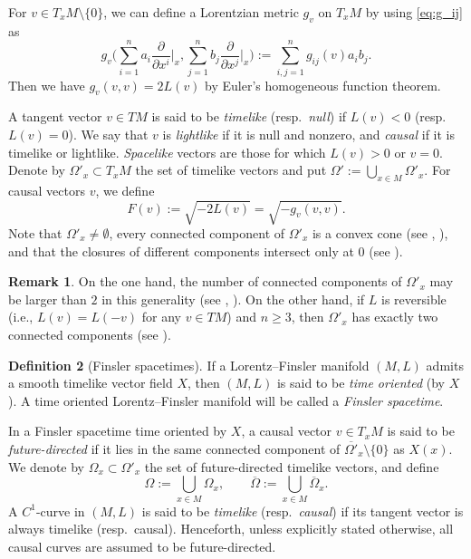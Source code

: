 \documentclass[a4paper,11pt]{article}
\numberwithin{equation}{section}
\theoremstyle{definition}
\newtheorem{definition}{Definition}[section]
\newtheorem{remark}[definition]{Remark}
\theoremstyle{plain}
\newcommand{\del}{\partial}
\begin{document}
For $v \in T_xM \setminus \{0\}$, we can define a Lorentzian metric $g_v$ on $T_xM$
by using \eqref{eq:g_ij} as
\begin{equation}\label{eq:g_v}
g_v \Bigg( \sum_{i=1}^n a_i \frac{\del}{\del x^i}\bigg|_x,
 \sum_{j=1}^n b_j \frac{\del}{\del x^j}\bigg|_x \Bigg)
 :=\sum_{i,j=1}^n g_{ij}(v) a_i b_j.
\end{equation}
Then we have $g_v(v,v)=2L(v)$ by Euler's homogeneous function theorem.

A tangent vector $v \in TM $ is said to be \emph{timelike} (resp.\ \emph{null})
if $L(v)<0$ (resp.\ $L(v)=0$).
We say that $v$ is \emph{lightlike} if it is null and nonzero, and \emph{causal} if it is timelike or lightlike.
\emph{Spacelike} vectors are those for which $L(v)>0$ or $v=0$.
Denote by $\Omega'_x \subset T_xM$ the set of timelike vectors and put
$\Omega' :=\bigcup_{x \in M} \Omega'_x$.
For causal vectors $v$, we define
\begin{equation}\label{eq:LtoF}
F(v) :=\sqrt{-2L(v)} =\sqrt{-g_v(v,v)}.
\end{equation}
Note that $\Omega'_x \neq \emptyset$, every connected component of $\Omega'_x$ is a convex cone (see \cite{Be},  \cite[Lemma~2.3]{LMO1}),
and that the closures of different components intersect only at $0$ (see  \cite[Proposition~1]{Min-cone}).

\begin{remark}\label{rm:Omega}
On the one hand, the number of connected components of $\Omega'_x$ may be larger than $2$ in this generality (see \cite{Be}, \cite[Example~2.4]{LMO1}).
On the other hand, if $L$ is reversible (i.e., $L(v)=L(-v)$ for any $v\in TM$) and $n \ge 3$, then $\Omega'_x$ has exactly two connected components (see \cite[Theorem 7]{Min-cone}).
\end{remark}

\begin{definition}[Finsler spacetimes]\label{df:spacetime}
If a Lorentz--Finsler manifold $(M,L)$ admits a smooth timelike vector field $X$,
then $(M,L)$ is said to be \emph{time oriented} (by $X$).
A time oriented Lorentz--Finsler manifold will be called a \emph{Finsler spacetime}.
\end{definition}

In a Finsler spacetime time oriented by $X$,
a causal vector $v \in T_xM$ is said to be \emph{future-directed}
if it lies in the same connected component of $\overline{\Omega'}\!_x \setminus \{0\}$ as $X(x)$.
We denote by $\Omega_x \subset \Omega'_x$ the set of future-directed timelike vectors,
and define
\[ \Omega :=\bigcup_{x \in M} \Omega_x, \qquad
 \overline{\Omega} :=\bigcup_{x \in M} \overline{\Omega}_x. \]
A $C^1$-curve in $(M,L)$ is said to be \emph{timelike} (resp.\ \emph{causal})
if its tangent vector is always timelike (resp.\ causal).
Henceforth, unless explicitly stated otherwise, all causal curves are assumed to be future-directed.
\end{document}
